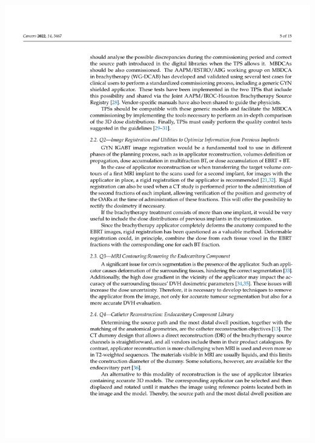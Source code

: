 \documentclass[
  a4paper,
]{scrreprt}
\begin{document}
\includegraphics{articulos/cancers/cancers-05.png}
\end{document}
